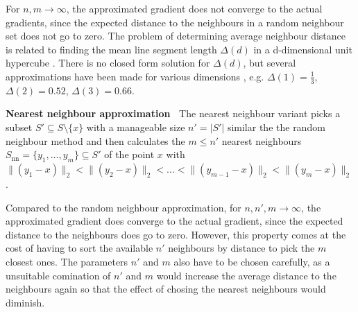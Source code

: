 \documentclass[
  a4paper,  %
  twoside,  %
  bibliography=totoc,
  headsepline,
  cleardoublepage=empty,
  parskip=half,
  draft=false
]{scrbook}
\begin{document}
For $n,m \to \infty$, the approximated gradient does not converge to the actual gradients, since the expected distance to the neighbours in a random neighbour set does not go to zero.
The problem of determining average neighbour distance is related to finding the mean line segment length $\Delta (d)$ in a d-dimensional unit hypercube \cite{}.
There is no closed form solution for $\Delta (d)$, but several approximations have been made for various dimensions \cite{}, e.g. $\Delta (1)=\frac{1}{3}$, $\Delta (2)=0.52$, $\Delta (3)=0.66$.

\vspace{2mm}
\textbf{Nearest neighbour approximation~}
The nearest neighbour variant picks a subset $S' \subseteq S \setminus \{x\}$ with a manageable size $n'=|S'|$ similar the the random neighbour method and then calculates the $m \leq n'$ nearest neighbours $S_{\text{nn}}=\{y_1,\dots,y_m\} \subseteq S'$ of the point $x$ with $\|(y_1-x)\|_2 < \|(y_2-x)\|_2< \dots<\|(y_{m-1}-x)\|_2 < \|(y_{m}-x)\|_2$.

Compared to the random neighbour approximation, for $n,n',m \to \infty$, the approximated gradient does converge to the actual gradient, since the expected distance to the neighbours does go to zero.
However, this property comes at the cost of having to sort the available $n'$ neighbours by distance to pick the $m$ closest ones.
The parameters $n'$ and $m$ also have to be chosen carefully, as a unsuitable comination of $n'$ and $m$ would increase the average distance to the neighbours again so that the effect of chosing the nearest neighbours would diminish.
\end{document}

